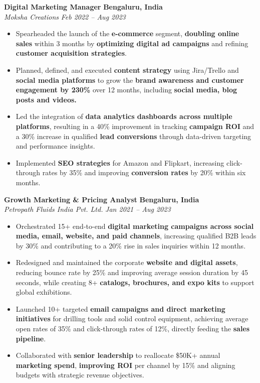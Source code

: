 \documentclass[10pt]{extarticle}
\newcommand{\job}[4]{%
  \textbf{#1} \hfill \textbf{#3}\\%
  \textit{#2} \hfill \textit{#4}\par%
  \vspace{-3pt}%
}
\begin{document}
\job{Digital Marketing Manager}
{Moksha Creations}
{Bengaluru, India}
{Feb 2022 -- Aug 2023}
\begin{itemize}
  \item Spearheaded the launch of the \textbf{e-commerce} segment, \textbf{doubling online sales} within 3 months by \textbf{optimizing digital ad campaigns} and refining \textbf{customer acquisition strategies}.
  \item Planned, defined, and executed \textbf{content strategy} using Jira/Trello and \textbf{social media platforms} to grow the \textbf{brand awareness and customer engagement by 230\%} over 12 months, including \textbf{social media, blog posts and videos.}
  \item Led the integration of \textbf{data analytics dashboards across multiple platforms}, resulting in a 40\% improvement in tracking \textbf{campaign ROI} and a 30\% increase in qualified \textbf{lead conversions} through data-driven targeting and performance insights.
  \item Implemented \textbf{SEO strategies} for Amazon and Flipkart, increasing {click-through rates} by 35\% and improving \textbf{conversion rates} by 20\% within six months.
\end{itemize}

\job{Growth Marketing \& Pricing Analyst}
{Petropath Fluids India Pvt. Ltd.}
{Bengaluru, India}
{Jan 2021 -- Aug 2023}
\begin{itemize}
  \item Orchestrated 15+ end-to-end \textbf{digital marketing campaigns across social media, email, website, and paid channels}, increasing qualified B2B leads by 30\% and contributing to a 20\% rise in sales inquiries within 12 months.
  \item Redesigned and maintained the corporate \textbf{website and digital assets}, reducing bounce rate by 25\% and improving average session duration by 45 seconds, while creating 8+ \textbf{catalogs, brochures, and expo kits} to support global exhibitions.
  \item Launched 10+ targeted \textbf{email campaigns and direct marketing initiatives} for drilling tools and solid control equipment, achieving average open rates of 35\% and click-through rates of 12\%, directly feeding the \textbf{sales pipeline}.
  \item Collaborated with \textbf{senior leadership} to reallocate \$50K+ annual \textbf{marketing spend}, \textbf{improving ROI} per channel by 15\% and aligning budgets with strategic revenue objectives.
\end{itemize}
\end{document}
